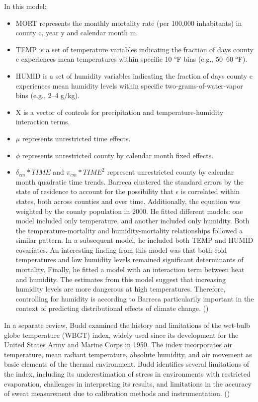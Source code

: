 \documentclass[
]{krantz}
\providecommand{\tightlist}{%
  \setlength{\itemsep}{0pt}\setlength{\parskip}{0pt}}
\begin{document}
In this model:

\begin{itemize}
\tightlist
\item
  MORT represents the monthly mortality rate (per 100,000 inhabitants) in county c, year y and calendar month m.
\item
  TEMP is a set of temperature variables indicating the fraction of days county c experiences mean temperatures within specific 10 °F bins (e.g., 50--60 °F).
\item
  HUMID is a set of humidity variables indicating the fraction of days county c experiences mean humidity levels within specific two-grams-of-water-vapor bins (e.g., 2--4 g/kg).
\item
  X is a vector of controls for precipitation and temperature-humidity interaction terms.
\item
  \(\mu\) represents unrestricted time effects.
\item
  \(\phi\) represents unrestricted county by calendar month fixed effects.
\item
  \(\delta_{cm}*TIME\) and \(\pi_{cm} * TIME^2\) represent unrestricted county by calendar month quadratic time trends.
  Barreca clustered the standard errors by the state of residence to account for the possibility that
  \(\epsilon\) is correlated within states, both across counties and over time. Additionally, the equation was weighted by the county population in 2000.
  He fitted different models: one model included only temperature, and another included only humidity. Both the temperature-mortality and humidity-mortality relationships followed a similar pattern. In a subsequent model, he included both TEMP and HUMID covariates. An interesting finding from this model was that both cold temperatures and low humidity levels remained significant determinants of mortality.
  Finally, he fitted a model with an interaction term between heat and humidity. The estimates from this model suggest that increasing humidity levels are more dangerous at high temperatures.
  Therefore, controlling for humidity is according to Barreca particularily important in the context of predicting distributional effects of climate change. (\citet{barr})
\end{itemize}

In a separate review, Budd examined the history and limitations of the wet-bulb globe temperature (WBGT) index, widely used since its development for the United States Army and Marine Corps in 1950. The index incorporates air temperature, mean radiant temperature, absolute humidity, and air movement as basic elements of the thermal environment. Budd identifies several limitations of the index, including its underestimation of stress in environments with restricted evaporation, challenges in interpreting its results, and limitations in the accuracy of sweat measurement due to calibration methods and instrumentation. (\citet{budd})
\end{document}
